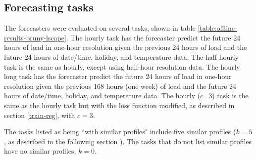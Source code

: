 \subsection{Forecasting tasks}
\label{forecasting-tasks}
The forecasters were evaluated on several tasks, shown in table \ref{table:offline-results-bruny-lscape}.
The hourly task has the forecaster predict the future 24 hours of load in one-hour resolution given the previous 24 hours of load and the future 24 hours of date/time, holiday, and temperature data.
The half-hourly task is the same as hourly, except using half-hour resolution data.
The hourly long task has the forecaster predict the future 24 hours of load in one-hour resolution given the previous 168 hours (one week) of load and the future 24 hours of date/time, holiday, and temperature data.
The hourly ($c$=3) task is the same as the hourly task but with the loss function modified, as described in section \ref{train-reg}, with $c=3$.

The tasks listed as being ``with similar profiles" include five similar profiles ($k=5$, as described in the following section ).
The tasks that do not list similar profiles have no similar profiles, $k=0$.

